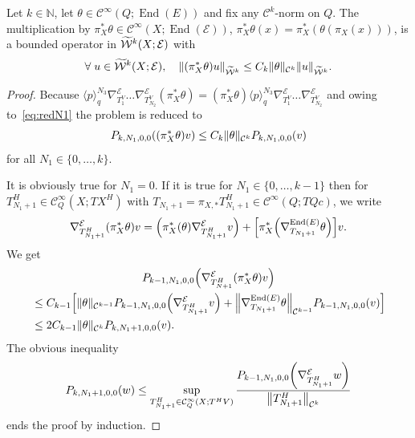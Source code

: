 \documentclass[10pt]{amsart}
\theoremstyle{definition}\newtheorem{defi}[theo]{Definition}\newtheorem{rema}[theo]{Remark}\newtheorem{exam}[theo]{Example}\newtheorem{exem}[theo]{Example}\newtheorem{nota}[theo]{Notation}
\newcommand{\N}{\mathbb{N}}
\newcommand{\clW}{\mathcal{W}}
\newcommand{\clC}{\mathcal{C}}
\newcommand{\clE}{\mathcal{E}}
\DeclareMathOperator{\End}{End}
\let\oldtilde\tilde
\renewcommand*{\tilde}[1]{\mathchoice{\widetilde{#1}}{\widetilde{#1}}{\oldtilde{#1}}{\oldtilde{#1}}}
\let\oldforall\forall
\renewcommand*{\forall}{\mathrel{\oldforall}}
\let\originalleft\left
\let\originalright\right
\renewcommand{\left}{\mathopen{}\mathclose\bgroup\originalleft}
\renewcommand{\right}{\aftergroup\egroup\originalright}
\begin{document}
\begin{prop}\label{pr:contTheta}
Let $k\in \N$, let $\theta\in \clC^{\infty}(Q;\End(E))$ and fix any $\clC^{k}$-norm on $Q$. The multiplication by $\pi_{X}^{*}\theta\in \clC^{\infty}(X;\End(\clE))$, $\pi_{X}^{*}\theta(x)=\pi_{X}^{*}(\theta(\pi_{X}(x)))$, is a bounded operator in $\tilde{\clW}^{k}(X;\clE)$ with
\begin{equation}\label{eq:thetaW}
\forall u\in \tilde{\clW}^{k}(X;\clE),\quad
\left\|(\pi_{X}^{*}\theta) u\right\|_{\widetilde{\clW}^{k}}\leq C_{k}\|\theta\|_{\clC^{k}}\|u\|_{\widetilde{\clW}^{k}}.
\end{equation}
\end{prop}
\begin{proof}
Because $\langle p\rangle_{q}^{N_{3}}\nabla_{T_{1}^{V}}^{\clE}\dots \nabla^{\clE}_{T_{N_{2}}^{V}}(\pi_{X}^{*}\theta)= (\pi_{X}^{*}\theta)\langle p\rangle_{q}^{N_{3}}\nabla_{T_{1}^{V}}^{\clE}\dots \nabla^{\clE}_{T_{N_{2}}^{V}}$ and owing to~\eqref{eq:redN1} the problem is reduced to
\[
P_{k,N_{1},0,0}\left(\left(\pi_{X}^{*}\theta\right)v\right)\leq C_{k}\|\theta\|_{\clC^{k}}P_{k,N_{1},0,0}(v)
\]
for all $N_{1}\in \{0,\dots,k\}$.

It is obviously true for $N_{1}=0$. If it is true for $N_{1}\in \{0,\dots, k-1\}$ then for $T_{N_{1}+1}^{H}\in \clC^{\infty}_{Q}(X;TX^{H})$ with $T_{N_{1}+1}=\pi_{X,*}T_{N_{1}+1}^{H}\in \clC^{\infty}(Q;TQc)$, we write
\[
\nabla_{T_{N_{1}+1}^{H}}^{\clE}\left(\pi_{X}^{*}\theta\right)v=\left(\pi_{X}^{*}(\theta)\nabla_{T_{N_{1}+1}^{H}}^{\clE}v\right)+ \left[\pi_{X}^{*}\left(\nabla_{T_{N_{1}+1}}^{\End(E)}\theta\right)\right]v.
\]
We get
\begin{multline*}
P_{k-1,N_{1},0,0}\left(\nabla_{T_{N+1}^{H}}^{\clE}\left(\pi_{X}^{*}\theta\right)v\right)\\
\begin{aligned}
&\leq C_{k-1}\Bigl[\|\theta\|_{\clC^{k-1}}P_{k-1,N_{1},0,0}\left(\nabla_{T_{N_{1}+1}^{H}}^{\clE}v\right)+
\left\|\nabla_{T_{N_{1}+1}}^{\End(E)}\theta\right\|_{\clC^{k-1}} P_{k-1,N_{1},0,0}(v)
\Bigr]\\
&\leq 2C_{k-1}\|\theta\|_{\clC^{k}}P_{k,N_{1}+1,0,0}(v).
\end{aligned}
\end{multline*}
The obvious inequality
\[
P_{k,N_{1}+1,0,0}(w)\leq \sup_{T_{N_{1}+1}^{H}\in \clC^{\infty}_{Q}\left(X;T^{H}V\right)}
\frac{P_{k-1,N_{1},0,0}\left(\nabla_{T_{N_{1}+1}^{H}}^{\clE}w\right)}{\left\|T_{N_{1}+1}^{H}\right\|_{\clC^{k}}}
\]
ends the proof by induction.
\end{proof}
\end{document}
